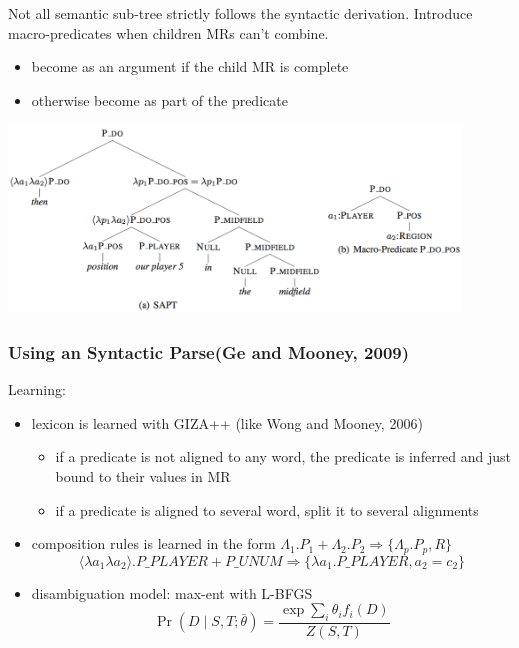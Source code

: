 \documentclass{beamer}
\begin{document}
\begin{frame}
     {
        Not all semantic sub-tree strictly follows the syntactic derivation.
        Introduce macro-predicates when children MRs can't combine.
        \begin{itemize}
            \item become as an argument if the child MR is complete
            \item otherwise become as part of the predicate
        \end{itemize}

        \begin{center}
            \includegraphics[width=12cm,height=5cm]{img/sapt-parse-macro-predicate.png}
        \end{center}
    }
\end{frame}

\begin{frame}
    \frametitle{Using an Syntactic Parse(Ge and Mooney, 2009)}
    Learning:
    \begin{itemize}
        \item lexicon is learned with GIZA++ (like Wong and Mooney, 2006)
            \begin{itemize}
                \item if a predicate is not aligned to any word, the predicate is inferred
                    and just bound to their values in MR
                \item if a predicate is aligned to several word, split it to several alignments
            \end{itemize}\pause
        \item composition rules is learned in the form $\Lambda_1.P_1 + \Lambda_2.P_2
            \Rightarrow \{\Lambda_p.P_p,R\}$
            \[
                \langle \lambda a_1\lambda a_2\rangle . P\_PLAYER + P\_UNUM \Rightarrow
                \{\lambda a_1.P\_PLAYER, a_2=c_2\}
            \]
        \item disambiguation model: max-ent with L-BFGS
            \[
                \Pr(D\mid S,T;\bar\theta)=\frac{\exp\sum_i\theta_if_i(D)}{Z(S,T)}
            \]
    \end{itemize}
\end{frame}
\end{document}
